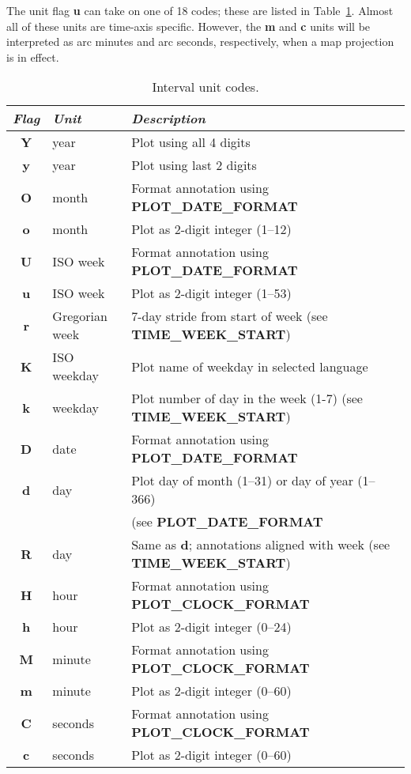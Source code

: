 The unit flag \textbf{u} can take on one of 18 codes; these are listed in  Table~\ref{tbl:units}.
Almost all of these units are time-axis specific.  However, the \textbf{m} and \textbf{c} units will be
interpreted as arc minutes and arc seconds, respectively, when a map projection is in effect.

\begin{table}[h]
\centering
\begin{tabular}{|c|l|l|} \hline
\emph{Flag}	& \emph{Unit} & \emph{Description} \\ \hline
\textbf{Y}	&	year		& Plot using all 4 digits \\ \hline
\textbf{y}	&	year		& Plot using last 2 digits \\ \hline
\textbf{O}	&	month		& Format annotation using \textbf{PLOT\_DATE\_FORMAT} \\ \hline
\textbf{o}	&	month		& Plot as 2-digit integer (1--12) \\ \hline
\textbf{U}	&	ISO week	& Format annotation using \textbf{PLOT\_DATE\_FORMAT} \\ \hline
\textbf{u}	&	ISO week	& Plot as 2-digit integer (1--53) \\ \hline
\textbf{r}	&	Gregorian week	& 7-day stride from start of week (see \textbf{TIME\_WEEK\_START}) \\ \hline
\textbf{K}	&	ISO weekday	& Plot name of weekday in selected language \\ \hline
\textbf{k}	&	weekday		& Plot number of day in the week (1-7)  (see \textbf{TIME\_WEEK\_START})\\ \hline
\textbf{D}	&	date		& Format annotation using \textbf{PLOT\_DATE\_FORMAT} \\ \hline
\textbf{d}	&	day		& Plot day of month (1--31) or day of year (1--366) \\
		&			& (see \bf{PLOT\_DATE\_FORMAT} \\ \hline
\textbf{R}	&	day		& Same as \textbf{d}; annotations aligned with week (see \textbf{TIME\_WEEK\_START})\\ \hline
\textbf{H}	&	hour		& Format annotation using \textbf{PLOT\_CLOCK\_FORMAT} \\ \hline
\textbf{h}	&	hour		& Plot as 2-digit integer (0--24) \\ \hline
\textbf{M}	&	minute		& Format annotation using \textbf{PLOT\_CLOCK\_FORMAT} \\ \hline
\textbf{m}	&	minute		& Plot as 2-digit integer (0--60) \\ \hline
\textbf{C}	&	seconds		& Format annotation using \textbf{PLOT\_CLOCK\_FORMAT} \\ \hline
\textbf{c}	&	seconds		& Plot as 2-digit integer (0--60) \\ \hline
\end{tabular}
\caption{Interval unit codes.}
\label{tbl:units}
\end{table}

